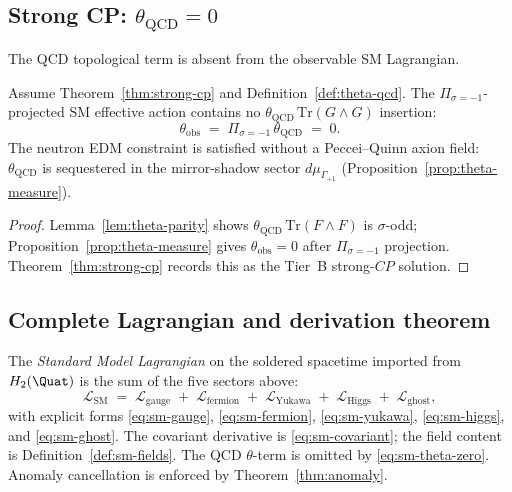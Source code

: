 \subsection{Strong CP: $\theta_{\mathrm{QCD}}=0$}
\label{sec:sm-lagrangian:theta}

The QCD topological term is absent from the observable SM Lagrangian.

\begin{proposition}[Observable $\theta_{\mathrm{QCD}}=0$]
\label{prop:sm-theta-zero}
Assume Theorem~\ref{thm:strong-cp} and Definition~\ref{def:theta-qcd}. The
$\Pi_{\sigma=-1}$-projected SM effective action contains no
$\theta_{\mathrm{QCD}}\,\mathrm{Tr}(G\wedge G)$ insertion:
\begin{equation}\label{eq:sm-theta-zero}
  \theta_{\mathrm{obs}}
  \;=\;
  \Pi_{\sigma=-1}\,\theta_{\mathrm{QCD}}
  \;=\;
  0.
\end{equation}
The neutron EDM constraint is satisfied without a Peccei--Quinn axion field:
$\theta_{\mathrm{QCD}}$ is sequestered in the mirror-shadow sector
$d\mu_{\Gamma_{+1}}$ (Proposition~\ref{prop:theta-measure}).
\end{proposition}

\begin{proof}
Lemma~\ref{lem:theta-parity} shows $\theta_{\mathrm{QCD}}\,
\mathrm{Tr}(F\wedge F)$ is $\sigma$-odd; Proposition~\ref{prop:theta-measure}
gives $\theta_{\mathrm{obs}}=0$ after $\Pi_{\sigma=-1}$ projection.
Theorem~\ref{thm:strong-cp} records this as the Tier~B strong-$CP$ solution.
\end{proof}

\subsection{Complete Lagrangian and derivation theorem}
\label{sec:sm-lagrangian:complete}

\begin{definition}\label{def:sm-lagrangian}
The \emph{Standard Model Lagrangian} on the soldered spacetime imported from
$H_2(\Quat)$ is the sum of the five sectors above:
\begin{equation}\label{eq:sm-lagrangian}
  \mathcal{L}_{\mathrm{SM}}
  \;=\;
  \mathcal{L}_{\mathrm{gauge}}
  \;+\;
  \mathcal{L}_{\mathrm{fermion}}
  \;+\;
  \mathcal{L}_{\mathrm{Yukawa}}
  \;+\;
  \mathcal{L}_{\mathrm{Higgs}}
  \;+\;
  \mathcal{L}_{\mathrm{ghost}},
\end{equation}
with explicit forms \eqref{eq:sm-gauge}, \eqref{eq:sm-fermion},
\eqref{eq:sm-yukawa}, \eqref{eq:sm-higgs}, and \eqref{eq:sm-ghost}. The
covariant derivative is \eqref{eq:sm-covariant}; the field content is
Definition~\ref{def:sm-fields}. The QCD $\theta$-term is omitted by
\eqref{eq:sm-theta-zero}. Anomaly cancellation is enforced by
Theorem~\ref{thm:anomaly}.
\end{definition}

